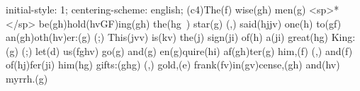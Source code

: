 initial-style: 1;
centering-scheme: english;
(c4)The(f) wise(gh) men(g) <sp>*</sp> be(gh)hold(hvGF)ing(gh) the(hg~) star(g) (,) said(hjjv) one(h) to(gf) an(gh)oth(hv)er:(g) (;) This(jvv) is(kv) the(j) sign(ji) of(h) a(ji) great(hg) King:(g) (;) let(d) us(fghv) go(g) and(g) en(g)quire(hi) af(gh)ter(g) him,(f) (,) and(f) of(hj)fer(ji) him(hg) gifts:(ghg) (,) gold,(e) frank(fv)in(gv)cense,(gh) and(hv) myrrh.(g)
